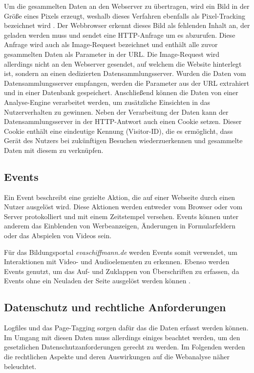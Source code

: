 Um die gesammelten Daten an den Webserver zu übertragen, wird ein Bild in der Größe eines Pixels erzeugt, weshalb dieses Verfahren ebenfalls als Pixel-Tracking bezeichnet wird \parencite[Kap.2.3]{Hassler2019}. Der Webbrowser erkennt dieses Bild als fehlenden Inhalt an, der geladen werden muss und sendet eine HTTP-Anfrage um es abzurufen. Diese Anfrage wird auch als Image-Request bezeichnet und enthält alle zuvor gesammelten Daten als Parameter in der URL. Die Image-Request wird allerdings nicht an den Webserver gesendet, auf welchem die Website hinterlegt ist, sondern an einen dedizierten Datensammlungsserver. Wurden die Daten vom Datensammlungsserver empfangen, werden die Parameter aus der URL extrahiert und in einer Datenbank gespeichert. Anschließend können die Daten von einer Analyse-Engine verarbeitet werden, um zusätzliche Einsichten in das Nutzerverhalten zu gewinnen. Neben der Verarbeitung der Daten kann der Datensammlungsserver in der HTTP-Antwort auch einen Cookie setzen. Dieser Cookie enthält eine eindeutige Kennung (Visitor-ID), die es ermöglicht, dass Gerät des Nutzers bei zukünftigen Besuchen wiederzuerkennen und gesammelte Daten mit diesem zu verknüpfen. \parencite[S.70-72]{Dykes2014}

\subsection{Events}
\label{sec:events}
Ein Event beschreibt eine gezielte Aktion, die auf einer Webseite durch einen Nutzer ausgelöst wird. Diese Aktionen werden entweder vom Browser oder vom Server protokolliert und mit einem Zeitstempel versehen. Events können unter anderem das Einblenden von Werbeanzeigen, Änderungen in Formularfeldern oder das Abspielen von Videos sein. \parencite[S.13]{WAA2008}

Für das Bildungsportal \textit{evaschiffmann.de} werden Events somit verwendet, um Interaktionen mit Video- und Audioelementen zu erkennen. Ebenso werden Events genutzt, um das Auf- und Zuklappen von Überschriften zu erfassen, da Events ohne ein Neuladen der Seite ausgelöst werden können \parencite{ATInternet}.

\subsection{Datenschutz und rechtliche Anforderungen}
\label{sec:datenschutz}
Logfiles und das Page-Tagging sorgen dafür das die Daten erfasst werden können. Im Umgang mit diesen Daten muss allerdings einiges beachtet werden, um den gesetzlichen Datenschutzanforderungen gerecht zu werden. Im Folgenden werden die rechtlichen Aspekte und deren Auswirkungen auf die Webanalyse näher beleuchtet.

